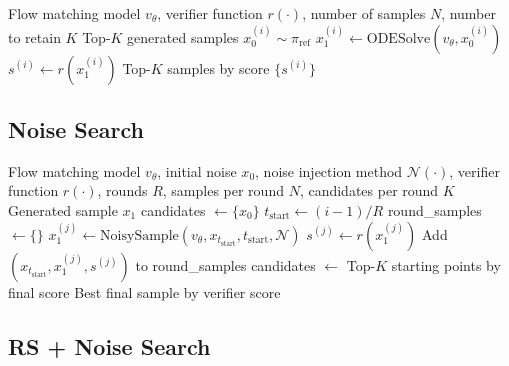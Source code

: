 \documentclass{article} %
\begin{document}
\begin{algorithm}[H]
\caption{Random Search (Best-of-$N$)}
\label{alg:best-of-n}
\begin{algorithmic}[1]
\Require Flow matching model $v_\theta$, verifier function $r(\cdot)$, number of samples $N$, number to retain $K$
\Ensure Top-$K$ generated samples
    \State $x_0^{(i)} \sim \pi_{\text{ref}}$ 
    \State $x_1^{(i)} \leftarrow \text{ODESolve}(v_\theta, x_0^{(i)})$ 
    \State $s^{(i)} \leftarrow r(x_1^{(i)})$ 
\EndFor
\State \Return Top-$K$ samples by score $\{s^{(i)}\}$
\end{algorithmic}
\end{algorithm}

\subsection{Noise Search}
\label{app:noise-search}

\begin{algorithm}[H]
\caption{Multi-Round Noise Search}
\label{alg:noise-search}
\begin{algorithmic}[1]
\Require Flow matching model $v_\theta$, initial noise $x_0$, noise injection method $\mathcal{N}(\cdot)$, verifier function $r(\cdot)$, rounds $R$, samples per round $N$, candidates per round $K$
\Ensure Generated sample $x_1$
\State candidates $\leftarrow \{x_0\}$ 
    \State $t_{\text{start}} \leftarrow (i-1) / R$ 
    \State round\_samples $\leftarrow \{\}$
            \State $x_1^{(j)} \leftarrow \text{NoisySample}(v_\theta, x_{t_{\text{start}}}, t_{\text{start}}, \mathcal{N})$
            \State $s^{(j)} \leftarrow r(x_1^{(j)})$
            \State Add $(x_{t_{\text{start}}}, x_1^{(j)}, s^{(j)})$ to round\_samples
        \EndFor
    \EndFor
        \State candidates $\leftarrow$ Top-$K$ starting points by final score
    \Else
        \State \Return Best final sample by verifier score
    \EndIf
\EndFor
\end{algorithmic}
\end{algorithm}


\subsection{RS + Noise Search}
\label{app:rs-noise-search}
\end{document}
